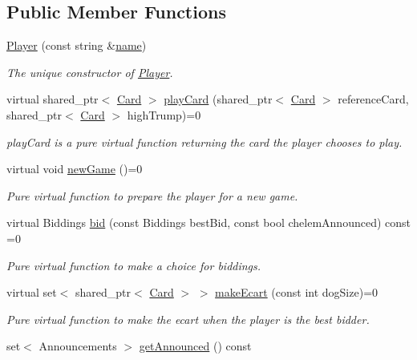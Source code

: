 \subsection*{\-Public \-Member \-Functions}
\begin{DoxyCompactItemize}
\item 
\hyperlink{classPlayer_a5a2790fccf10c30106370d910c96d317}{\-Player} (const string \&\hyperlink{classPlayer_acf0355128a99ee20ad9931b760fb2de1}{name})
\begin{DoxyCompactList}\small\item\em \-The unique constructor of \hyperlink{classPlayer}{\-Player}. \end{DoxyCompactList}\item 
virtual shared\-\_\-ptr$<$ \hyperlink{classCard}{\-Card} $>$ \hyperlink{classPlayer_aeba090a124bfd9a3666d2d793439cae0}{play\-Card} (shared\-\_\-ptr$<$ \hyperlink{classCard}{\-Card} $>$ reference\-Card, shared\-\_\-ptr$<$ \hyperlink{classCard}{\-Card} $>$ high\-Trump)=0
\begin{DoxyCompactList}\small\item\em play\-Card is a pure virtual function returning the card the player chooses to play. \end{DoxyCompactList}\item 
\hypertarget{classPlayer_a76a707ceb6f24b0a2a801434ee5a60ad}{virtual void \hyperlink{classPlayer_a76a707ceb6f24b0a2a801434ee5a60ad}{new\-Game} ()=0}\label{classPlayer_a76a707ceb6f24b0a2a801434ee5a60ad}

\begin{DoxyCompactList}\small\item\em \-Pure virtual function to prepare the player for a new game. \end{DoxyCompactList}\item 
virtual \-Biddings \hyperlink{classPlayer_a4bb658ca7b46f32a42578b884ad7fe82}{bid} (const \-Biddings best\-Bid, const bool chelem\-Announced) const =0
\begin{DoxyCompactList}\small\item\em \-Pure virtual function to make a choice for biddings. \end{DoxyCompactList}\item 
virtual set$<$ shared\-\_\-ptr$<$ \hyperlink{classCard}{\-Card} $>$ $>$ \hyperlink{classPlayer_a34c9e9f402c6a68d6e16caebdb93a33f}{make\-Ecart} (const int dog\-Size)=0
\begin{DoxyCompactList}\small\item\em \-Pure virtual function to make the ecart when the player is the best bidder. \end{DoxyCompactList}\item 
\hypertarget{classPlayer_a5573dd91ddb6fa8874d5a7f7a186f186}{set$<$ \-Announcements $>$ \hyperlink{classPlayer_a5573dd91ddb6fa8874d5a7f7a186f186}{get\-Announced} () const }\label{classPlayer_a5573dd91ddb6fa8874d5a7f7a186f186}


\end{DoxyCompactItemize}
